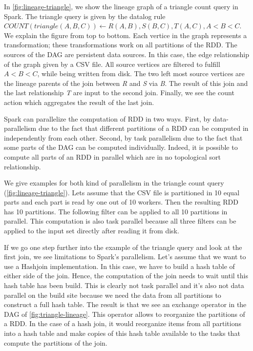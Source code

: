 
In \cref{fig:lineage-triangle}, we show the lineage graph of a triangle  count query in Spark.
The triangle query is given by the datalog rule
$COUNT(triangle(A, B, C)) \leftarrow R(A, B), S(B, C), T(A, C), A < B < C $.
We explain the figure from top to bottom.
Each vertice in the graph represents a transformation; these transformations work on
all partitions of the RDD.
The sources of the DAG are persistent data sources.
In this case, the edge relationship of the graph given by a CSV file.
All source vertices are filtered to fulfill $A < B < C$, while being written from disk.
The two left most source vertices are the lineage parents of the join between \textit{R}
and \textit{S} via \textit{B}.
The result of this join and the last relationship \textit{T} are input to the second
join.
Finally, we see the count action which aggregates the result of the last join.

Spark can parallelize the computation of RDD in two ways.
First, by data-parallelism due to the fact that different partitions of a RDD can
be computed in independently from each other.
Second, by task parallelism due to the fact that some parts of the DAG can be computed
individually.
Indeed, it is possible to compute all parts of an RDD in parallel which are in no topological
sort relationship.

We give examples for both kind of parallelism in the triangle count query
(\cref{fig:lineage-triangle}).
Lets assume that the CSV file is partitioned in 10 equal parts and each part is read
by one out of 10 workers.
Then the resulting RDD has 10 partitions.
The following filter can be applied to all 10 partitions in parallel.
This computation is also task parallel because all three filters can be applied to the
input set directly after reading it from disk.

If we go one step further into the example of the triangle query and look at the first
join, we see limitations to Spark's parallelism.
Let's assume that we want to use a Hashjoin implementation.
In this case, we have to build a hash table of either side of the join.
Hence, the computation of the join needs to wait until this hash table has been build.
This is clearly not task parallel and it's also not data parallel on the build site
because we need the data from all partitions to construct a full hash table.
The result is that we see an exchange operator in the DAG of \cref{fig:triangle-lineage}.
This operator allows to reorganize the partitions of a RDD.
In the case of a hash join, it would reorganize items from all partitions into a hash
table and make copies of this hash table available to the tasks that compute the
partitions of the join.

